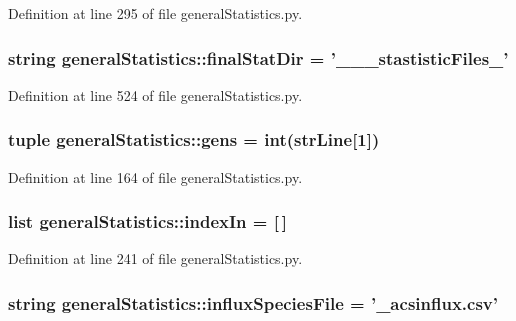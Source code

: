 \-Definition at line 295 of file general\-Statistics.\-py.

\hypertarget{namespacegeneral_statistics_a4f197037332b3c3891277d8becc9fb92}{
\subsubsection[{final\-Stat\-Dir}]{\setlength{\rightskip}{0pt plus 5cm}string {\bf general\-Statistics\-::final\-Stat\-Dir} = '\-\_\-\-\_\-\_\-stastistic\-Files\-\_\-'}}\label{namespacegeneral_statistics_a4f197037332b3c3891277d8becc9fb92}


\-Definition at line 524 of file general\-Statistics.\-py.

\hypertarget{namespacegeneral_statistics_a973d65dc8f8e3c00253543a466ec0482}{
\subsubsection[{gens}]{\setlength{\rightskip}{0pt plus 5cm}tuple {\bf general\-Statistics\-::gens} = int({\bf str\-Line}\mbox{[}1\mbox{]})}}\label{namespacegeneral_statistics_a973d65dc8f8e3c00253543a466ec0482}


\-Definition at line 164 of file general\-Statistics.\-py.

\hypertarget{namespacegeneral_statistics_a5182af5b7ba2ac034a2be23a49197e8e}{
\subsubsection[{index\-In}]{\setlength{\rightskip}{0pt plus 5cm}list {\bf general\-Statistics\-::index\-In} = \mbox{[}$\,$\mbox{]}}}\label{namespacegeneral_statistics_a5182af5b7ba2ac034a2be23a49197e8e}


\-Definition at line 241 of file general\-Statistics.\-py.

\hypertarget{namespacegeneral_statistics_adfaa9da42539b29b71a53ddb2da53688}{
\subsubsection[{influx\-Species\-File}]{\setlength{\rightskip}{0pt plus 5cm}string {\bf general\-Statistics\-::influx\-Species\-File} = '\-\_\-acsinflux.\-csv'}}\label{namespacegeneral_statistics_adfaa9da42539b29b71a53ddb2da53688}


